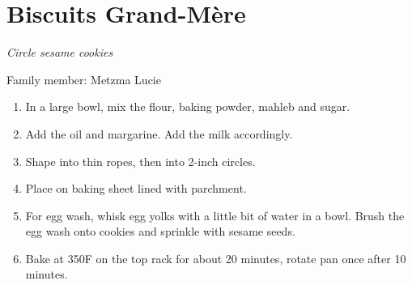 \chapter{Biscuits Grand-Mère}
\label{ch:biscuits_grandmere}


\textit{Circle sesame cookies}

Family member: Metzma Lucie

\begin{enumerate}
    \item In a large bowl, mix the flour, baking powder, mahleb and sugar.
    \item Add the oil and margarine. Add the milk accordingly.
    \item Shape into thin ropes, then into 2-inch circles.
    \item Place on baking sheet lined with parchment.
    \item For egg wash, whisk egg yolks with a little bit of water in a bowl. Brush the egg wash onto cookies and sprinkle with sesame seeds.
    \item Bake at 350\degree F on the top rack for about 20 minutes, rotate pan once after 10 minutes.
\end{enumerate}
